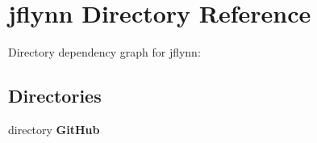\section{jflynn Directory Reference}
\label{dir_bdc778f2532979b14047db746cff355e}
Directory dependency graph for jflynn\-:
\subsection*{Directories}
\begin{DoxyCompactItemize}
\item 
directory {\bf Git\-Hub}
\end{DoxyCompactItemize}
